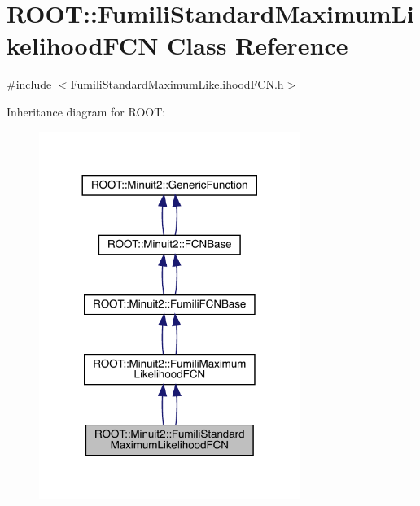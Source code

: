 \hypertarget{classROOT_1_1Minuit2_1_1FumiliStandardMaximumLikelihoodFCN}{}\section{R\+O\+OT\+:\+:Fumili\+Standard\+Maximum\+Likelihood\+F\+CN Class Reference}
\label{classROOT_1_1Minuit2_1_1FumiliStandardMaximumLikelihoodFCN}


{\ttfamily \#include $<$Fumili\+Standard\+Maximum\+Likelihood\+F\+C\+N.\+h$>$}



Inheritance diagram for R\+O\+OT\+:\nopagebreak
\begin{figure}[H]
\begin{center}
\leavevmode
\includegraphics[width=240pt]{d0/daa/classROOT_1_1Minuit2_1_1FumiliStandardMaximumLikelihoodFCN__inherit__graph}
\end{center}
\end{figure}


